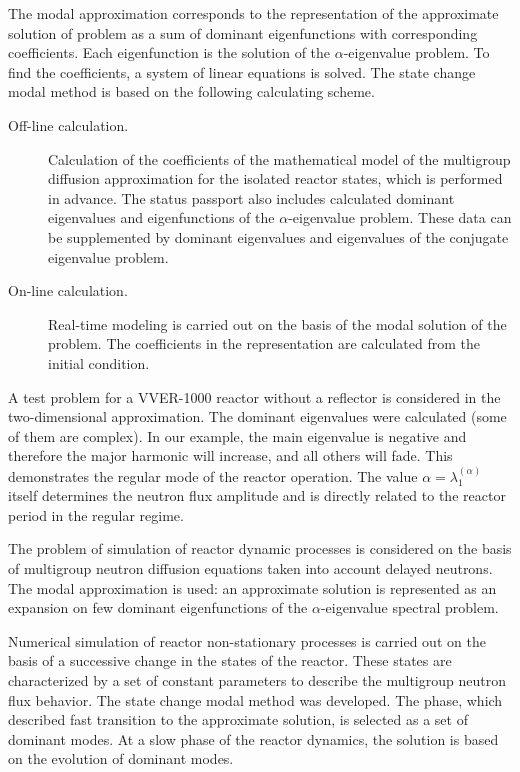 \documentclass[a4paper]{jpconf}
\begin{document}
The modal approximation corresponds to the representation of the approximate solution of problem as a sum of dominant eigenfunctions with corresponding coefficients. Each eigenfunction is the solution of the  $\alpha$-eigenvalue problem.
To find the coefficients, a system of linear equations is solved. The state change modal method is based on the following calculating scheme.
\begin{description}
 \item[Off-line calculation.] Calculation of the coefficients of the mathematical model of the multigroup diffusion approximation for the isolated reactor states, which is performed in advance. The status passport also includes calculated dominant eigenvalues and eigenfunctions of the  $\alpha$-eigenvalue problem. 
These data can be supplemented by dominant eigenvalues and eigenvalues of the conjugate eigenvalue problem.
 \item[On-line calculation.] Real-time modeling is carried out on the basis of the modal solution of the problem.
The coefficients in the representation  are calculated from the initial condition.    
\end{description}  
 
A test problem for a VVER-1000 reactor without a reflector is considered in the two-dimensional approximation.
The dominant eigenvalues were calculated (some of them are complex). In our example, the main eigenvalue is negative and therefore the major harmonic will increase, and all others will fade. This demonstrates the regular mode of the reactor operation. The value $\alpha = \lambda_1^{(\alpha)}$ itself determines the neutron flux amplitude and is directly related to the reactor period in the regular regime.

The problem of simulation of reactor dynamic processes is considered on the basis of multigroup neutron diffusion equations taken into account delayed neutrons.
The modal approximation is used: an approximate solution is represented as an expansion on few dominant eigenfunctions of the $\alpha$-eigenvalue spectral problem.

Numerical simulation of reactor non-stationary processes is carried out on the basis of a successive change in the states of the reactor. These states are characterized by a set of constant parameters to describe the multigroup neutron flux behavior.
The state change modal method was developed. The phase, which described fast transition to the approximate solution, is selected as a set of dominant modes. At a slow phase of the reactor dynamics, the solution is based on the evolution of dominant modes.
\end{document}
